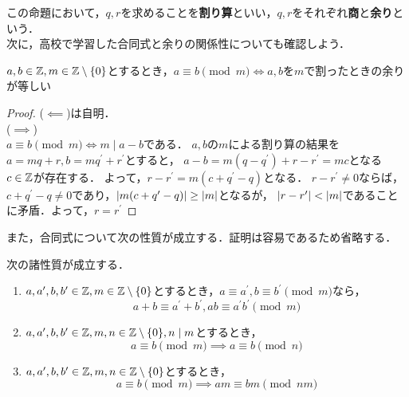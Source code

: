     この命題において，$q,r$を求めることを\textbf{割り算}といい，$q,r$をそれぞれ\textbf{商}と\textbf{余り}という．\\
    次に，高校で学習した合同式と余りの関係性についても確認しよう．

    \begin{prop} \label{1.4.17}
      $a,b \in \mathbb{Z}, m \in \mathbb{Z} \setminus \lbrace0\rbrace$とするとき，$a \equiv b \pmod m \iff a,b$を$m$で割ったときの余りが等しい
    \end{prop}
    \begin{proof}
      ($\impliedby$)は自明．\\
      ($\implies$)\\
      $a \equiv b \pmod m \iff m \mid a-b$である．
      $a,b$の$m$による割り算の結果を$a=mq+r, b=mq^{\prime} + r^{\prime}$とすると，
      $a-b = m(q - q^{\prime})+ r - r^{\prime} = mc$となる$c \in \mathbb{Z}$が存在する．
      よって，$r-r^{\prime} = m(c + q^{\prime} - q)となる．$
      $r - r^{\prime} \neq 0$ならば，$c+q^{\prime} - q \neq 0$であり，$\lvert m(c + q^{\prime} - q)\rvert \geq \lvert m\rvert$となるが，
      $\lvert r-r^{\prime}\rvert < \lvert m\rvert$であることに矛盾．よって，$r = r^{\prime}$ 
    \end{proof}

    また，合同式について次の性質が成立する．証明は容易であるため省略する．
    
    \begin{prop} \label{1.4.18}
      次の諸性質が成立する．
      \begin{enumerate}
        \item $a,a^{\prime}, b, b^{\prime} \in \mathbb{Z}, m \in \mathbb{Z} \setminus \lbrace0\rbrace$とするとき，$a \equiv a^{\prime}, b \equiv b^{\prime} \pmod m$なら，
          \begin{equation}
            a+b \equiv a^{\prime} + b^{\prime}, ab \equiv a^{\prime}b^{\prime} \pmod m \nonumber
          \end{equation}
        \item $a,a^{\prime}, b, b^{\prime} \in \mathbb{Z}, m, n \in \mathbb{Z} \setminus \lbrace0\rbrace, n \mid m$とするとき，
          \begin{equation}
            a \equiv b \pmod m \implies a \equiv b \pmod n \nonumber
          \end{equation}
        \item $a,a^{\prime}, b, b^{\prime} \in \mathbb{Z}, m, n \in \mathbb{Z} \setminus \lbrace0\rbrace$とするとき，
          \begin{equation}
            a \equiv b \pmod m \implies am \equiv bm \pmod {nm} \nonumber
          \end{equation}
      \end{enumerate}
    \end{prop}


